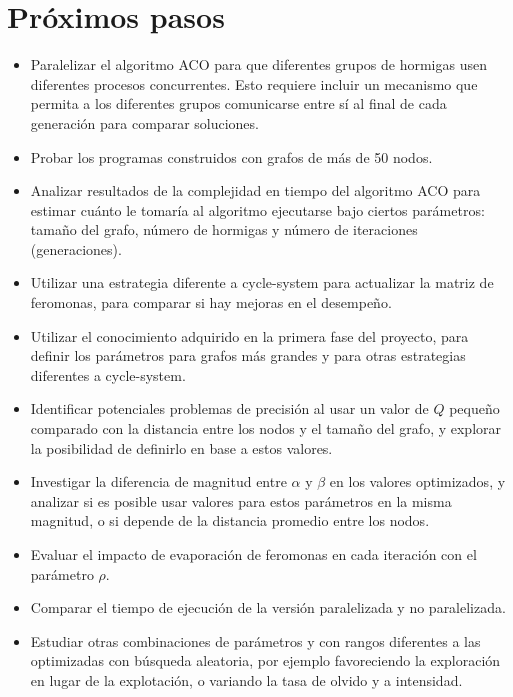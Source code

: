 \documentclass[conference]{IEEEtran}
\begin{document}
\section{Próximos pasos}
\begin{itemize}
\item Paralelizar el algoritmo ACO para que diferentes grupos de hormigas usen diferentes procesos concurrentes. Esto requiere incluir un mecanismo que permita a los diferentes grupos comunicarse entre sí al final de cada generación para comparar soluciones.
\item Probar los programas construidos con grafos de más de 50 nodos. 
\item Analizar resultados de la complejidad en tiempo del algoritmo ACO para estimar cuánto le tomaría al algoritmo ejecutarse bajo ciertos parámetros: tamaño del grafo, número de hormigas y número de iteraciones (generaciones).
\item Utilizar una estrategia diferente a cycle-system para actualizar la matriz de feromonas, para comparar si hay mejoras en el desempeño. 
\item Utilizar el conocimiento adquirido en la primera fase del proyecto, para definir los parámetros para grafos más grandes y para otras estrategias diferentes a cycle-system.
\item Identificar potenciales problemas de precisión al usar un valor de $Q$ pequeño comparado con la distancia entre los nodos y el tamaño del grafo, y explorar la posibilidad de definirlo en base a estos valores.
\item Investigar la diferencia de magnitud entre $\alpha$ y $\beta$ en los valores optimizados, y analizar si es posible usar valores para estos parámetros en la misma magnitud, o si depende de la distancia promedio entre los nodos.
\item Evaluar el impacto de evaporación de feromonas en cada iteración con el parámetro $\rho$.
\item Comparar el tiempo de ejecución de la versión paralelizada y no paralelizada.
\item Estudiar otras combinaciones de parámetros y con rangos diferentes a las optimizadas con búsqueda aleatoria, por ejemplo favoreciendo la exploración en lugar de la explotación, o variando la tasa de olvido y a intensidad.
\end{itemize}
\end{document}
